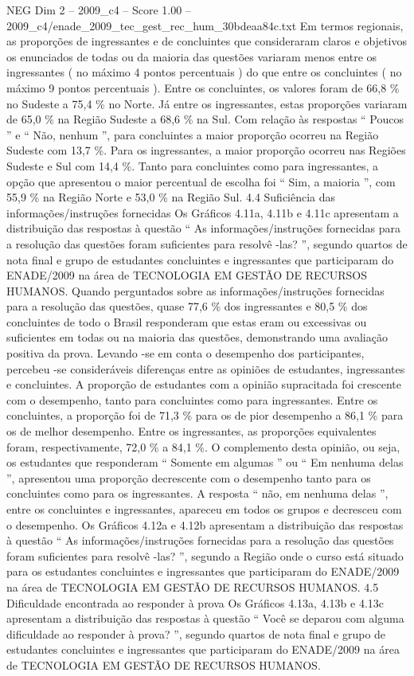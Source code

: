 \begin{textsample}{NEG Dim 2 – 2009\_c4 – Score 1.00 – 2009\_c4/enade\_2009\_tec\_gest\_rec\_hum\_30bdeaa84c.txt}
Em termos regionais, as proporções de ingressantes e de concluintes que consideraram claros e objetivos os enunciados de todas ou da maioria das questões variaram menos entre os ingressantes ( no máximo 4 pontos percentuais ) do que entre os concluintes ( no máximo 9 pontos percentuais ).
Entre os concluintes, os valores foram de 66,8 \% no Sudeste a 75,4 \% no Norte.
Já entre os ingressantes, estas proporções variaram de 65,0 \% na Região Sudeste a 68,6 \% na Sul.
Com relação às respostas “ Poucos ” e “ Não, nenhum ”, para concluintes a maior proporção ocorreu na Região Sudeste com 13,7 \%.
Para os ingressantes, a maior proporção ocorreu nas Regiões Sudeste e Sul com 14,4 \%.
Tanto para concluintes como para ingressantes, a opção que apresentou o maior percentual de escolha foi “ Sim, a maioria ”, com 55,9 \% na Região Norte e 53,0 \% na Região Sul. 4.4 Suficiência das informações/instruções fornecidas Os Gráficos 4.11a, 4.11b e 4.11c apresentam a distribuição das respostas à questão “ As informações/instruções fornecidas para a resolução das questões foram suficientes para resolvê -las? ”, segundo quartos de nota final e grupo de estudantes concluintes e ingressantes que participaram do ENADE/2009 na área de TECNOLOGIA EM GESTÃO DE RECURSOS HUMANOS.
Quando perguntados sobre as informações/instruções fornecidas para a resolução das questões, quase 77,6 \% dos ingressantes e 80,5 \% dos concluintes de todo o Brasil responderam que estas eram ou excessivas ou suficientes em todas ou na maioria das questões, demonstrando uma avaliação positiva da prova.
Levando -se em conta o desempenho dos participantes, percebeu -se consideráveis diferenças entre as opiniões de estudantes, ingressantes e concluintes.
A proporção de estudantes com a opinião supracitada foi crescente com o desempenho, tanto para concluintes como para ingressantes.
Entre os concluintes, a proporção foi de 71,3 \% para os de pior desempenho a 86,1 \% para os de melhor desempenho.
Entre os ingressantes, as proporções equivalentes foram, respectivamente, 72,0 \% a 84,1 \%.
O complemento desta opinião, ou seja, os estudantes que responderam “ Somente em algumas ” ou “ Em nenhuma delas ”, apresentou uma proporção decrescente com o desempenho tanto para os concluintes como para os ingressantes.
A resposta “ não, em nenhuma delas ”, entre os concluintes e ingressantes, apareceu em todos os grupos e decresceu com o desempenho.
Os Gráficos 4.12a e 4.12b apresentam a distribuição das respostas à questão “ As informações/instruções fornecidas para a resolução das questões foram suficientes para resolvê -las? ”, segundo a Região onde o curso está situado para os estudantes concluintes e ingressantes que participaram do ENADE/2009 na área de TECNOLOGIA EM GESTÃO DE RECURSOS HUMANOS. 4.5 Dificuldade encontrada ao responder à prova Os Gráficos 4.13a, 4.13b e 4.13c apresentam a distribuição das respostas à questão “ Você se deparou com alguma dificuldade ao responder à prova? ”, segundo quartos de nota final e grupo de estudantes concluintes e ingressantes que participaram do ENADE/2009 na área de TECNOLOGIA EM GESTÃO DE RECURSOS HUMANOS.

\end{textsample}
